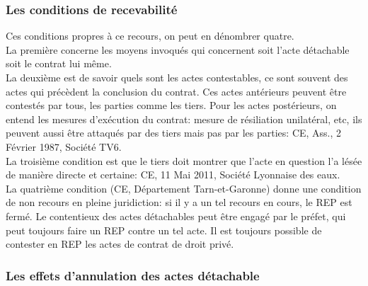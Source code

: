 \documentclass[10pt, a4paper, openany]{book}
\begin{document}
\subsubsection{Les conditions de recevabilité}

Ces conditions propres à ce recours, on peut en dénombrer quatre. \\
La première concerne les moyens invoqués qui concernent soit l'acte détachable soit le contrat lui même. \\
La deuxième est de savoir quels sont les actes contestables, ce sont souvent des actes qui précèdent la conclusion du contrat. Ces actes antérieurs peuvent être contestés par tous, les parties comme les tiers. Pour les actes postérieurs, on entend les mesures d'exécution du contrat: mesure de résiliation unilatéral, etc, ils peuvent aussi être attaqués par des tiers mais pas par les parties: CE, Ass., 2 Février 1987, Société TV6. \\
La troisième condition est que le tiers doit montrer que l'acte en question l'a lésée de manière directe et certaine: CE, 11 Mai 2011, Société Lyonnaise des eaux. \\
La quatrième condition (CE, Département Tarn-et-Garonne) donne une condition de non recours en pleine juridiction: si il y a un tel recours en cours, le REP est fermé. Le contentieux des actes détachables peut être engagé par le préfet, qui peut toujours faire un REP contre un tel acte. Il est toujours possible de contester en REP les actes de contrat de droit privé. 












\subsubsection{Les effets d'annulation des actes détachable}
\end{document}

